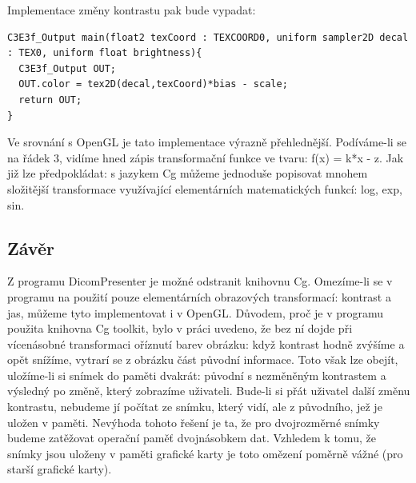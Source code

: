 Implementace změny kontrastu pak bude vypadat:
\begin{lstlisting}[label=DicomImageClass,caption={...}]
C3E3f_Output main(float2 texCoord : TEXCOORD0, uniform sampler2D decal : TEX0, uniform float brightness){
  C3E3f_Output OUT;
  OUT.color = tex2D(decal,texCoord)*bias - scale;
  return OUT;
}
\end{lstlisting}

Ve srovnání s OpenGL je tato implementace výrazně přehlednější. Podíváme-li se na řádek 3, vidíme hned zápis transformační funkce ve tvaru: f(x) = k*x - z. Jak již lze předpokládat: s jazykem Cg můžeme jednoduše popisovat mnohem složitější transformace využívající elementárních matematických funkcí: log, exp, sin.




\subsection{Závěr}
Z programu DicomPresenter je možné odstranit knihovnu Cg. Omezíme-li se v programu na použití pouze elementárních obrazových transformací: kontrast a jas, můžeme tyto implementovat i v OpenGL. Důvodem, proč je v programu použita knihovna Cg toolkit, bylo v práci \cite{neskudla} uvedeno, že bez ní dojde při vícenásobné transformaci oříznutí barev obrázku: když kontrast hodně zvýšíme a opět snížíme, vytrarí se z obrázku část původní informace. Toto však lze obejít, uložíme-li si snímek do paměti dvakrát: původní s nezměněným kontrastem a výsledný po změně, který zobrazíme uživateli. Bude-li si přát uživatel další změnu kontrastu, nebudeme jí počítat ze snímku, který vidí, ale z původního, jež je uložen v paměti. Nevýhoda tohoto řešení je ta, že pro dvojrozměrné snímky budeme zatěžovat operační paměť dvojnásobkem dat. Vzhledem k tomu, že snímky jsou uloženy v paměti grafické karty je toto omězení poměrně vážné (pro starší grafické karty).


